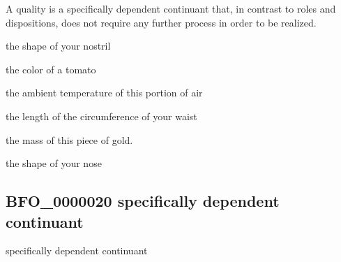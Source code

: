 \documentclass[letterpaper,10pt,english]{sphinxmanual}
\begin{document}
\begin{sphinxShadowBox}

\sphinxAtStartPar
A quality is a specifically dependent continuant that, in contrast to roles and dispositions, does not require any further process in order to be realized.
\end{sphinxShadowBox}

\begin{sphinxShadowBox}

\sphinxAtStartPar
the shape of your nostril

\sphinxAtStartPar
the color of a tomato

\sphinxAtStartPar
the ambient temperature of this portion of air

\sphinxAtStartPar
the length of the circumference of your waist

\sphinxAtStartPar
the mass of this piece of gold.

\sphinxAtStartPar
the shape of your nose
\end{sphinxShadowBox}

\begin{sphinxShadowBox}

\sphinxAtStartPar
{}
\end{sphinxShadowBox}
\begin{quote}

\ignorespaces \end{quote}


\subsection{BFO\_0000020 \sphinxhyphen{} specifically dependent continuant}
\label{\detokenize{doc-BFO_0000020:bfo-0000020-specifically-dependent-continuant}}\label{\detokenize{doc-BFO_0000020:index-0}}\label{\detokenize{doc-BFO_0000020::doc}}
\begin{sphinxShadowBox}

\sphinxAtStartPar
specifically dependent continuant
\end{sphinxShadowBox}

\begin{sphinxShadowBox}

\sphinxAtStartPar
{\hyperref[\detokenize{doc-BFO_0000002::doc}]{}}
\end{sphinxShadowBox}
\end{document}
